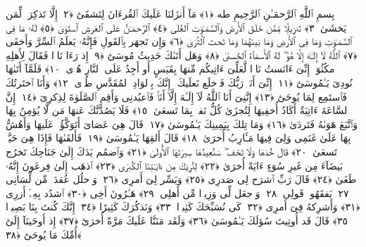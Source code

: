 
  
    
  
    
    

\nopagebreak
  بِسمِ ٱللَّهِ ٱلرَّحمَـٰنِ ٱلرَّحِيمِ
  طه ﴿١﴾
 مَآ أَنزَلنَا عَلَيكَ ٱلقُرءَانَ لِتَشقَىٰٓ ﴿٢﴾
 إِلَّا تَذكِرَةًۭ لِّمَن يَخشَىٰ ﴿٣﴾
 تَنزِيلًۭا مِّمَّن خَلَقَ ٱلأَرضَ وَٱلسَّمَـٰوَٟتِ ٱلعُلَى ﴿٤﴾
 ٱلرَّحمَـٰنُ عَلَى ٱلعَرشِ ٱستَوَىٰ ﴿٥﴾
 لَهُۥ مَا فِى ٱلسَّمَـٰوَٟتِ وَمَا فِى ٱلأَرضِ وَمَا بَينَهُمَا وَمَا تَحتَ ٱلثَّرَىٰ ﴿٦﴾
 وَإِن تَجهَر بِٱلقَولِ فَإِنَّهُۥ يَعلَمُ ٱلسِّرَّ وَأَخفَى ﴿٧﴾
 ٱللَّهُ لَآ إِلَـٰهَ إِلَّا هُوَ ۖ لَهُ ٱلأَسمَآءُ ٱلحُسنَىٰ ﴿٨﴾
 وَهَل أَتَىٰكَ حَدِيثُ مُوسَىٰٓ ﴿٩﴾
 إِذ رَءَا نَارًۭا فَقَالَ لِأَهلِهِ ٱمكُثُوٓا۟ إِنِّىٓ ءَانَستُ نَارًۭا لَّعَلِّىٓ ءَاتِيكُم مِّنهَا بِقَبَسٍ أَو أَجِدُ عَلَى ٱلنَّارِ هُدًۭى ﴿١٠﴾
 فَلَمَّآ أَتَىٰهَا نُودِىَ يَـٰمُوسَىٰٓ ﴿١١﴾
 إِنِّىٓ أَنَا۠ رَبُّكَ فَٱخلَع نَعلَيكَ ۖ إِنَّكَ بِٱلوَادِ ٱلمُقَدَّسِ طُوًۭى ﴿١٢﴾
 وَأَنَا ٱختَرتُكَ فَٱستَمِع لِمَا يُوحَىٰٓ ﴿١٣﴾
 إِنَّنِىٓ أَنَا ٱللَّهُ لَآ إِلَـٰهَ إِلَّآ أَنَا۠ فَٱعبُدنِى وَأَقِمِ ٱلصَّلَوٰةَ لِذِكرِىٓ ﴿١٤﴾
 إِنَّ ٱلسَّاعَةَ ءَاتِيَةٌ أَكَادُ أُخفِيهَا لِتُجزَىٰ كُلُّ نَفسٍۭ بِمَا تَسعَىٰ ﴿١٥﴾
 فَلَا يَصُدَّنَّكَ عَنهَا مَن لَّا يُؤمِنُ بِهَا وَٱتَّبَعَ هَوَىٰهُ فَتَردَىٰ ﴿١٦﴾
 وَمَا تِلكَ بِيَمِينِكَ يَـٰمُوسَىٰ ﴿١٧﴾
 قَالَ هِىَ عَصَاىَ أَتَوَكَّؤُا۟ عَلَيهَا وَأَهُشُّ بِهَا عَلَىٰ غَنَمِى وَلِىَ فِيهَا مَـَٔارِبُ أُخرَىٰ ﴿١٨﴾
 قَالَ أَلقِهَا يَـٰمُوسَىٰ ﴿١٩﴾
 فَأَلقَىٰهَا فَإِذَا هِىَ حَيَّةٌۭ تَسعَىٰ ﴿٢٠﴾
 قَالَ خُذهَا وَلَا تَخَف ۖ سَنُعِيدُهَا سِيرَتَهَا ٱلأُولَىٰ ﴿٢١﴾
 وَٱضمُم يَدَكَ إِلَىٰ جَنَاحِكَ تَخرُج بَيضَآءَ مِن غَيرِ سُوٓءٍ ءَايَةً أُخرَىٰ ﴿٢٢﴾
 لِنُرِيَكَ مِن ءَايَـٰتِنَا ٱلكُبرَى ﴿٢٣﴾
 ٱذهَب إِلَىٰ فِرعَونَ إِنَّهُۥ طَغَىٰ ﴿٢٤﴾
 قَالَ رَبِّ ٱشرَح لِى صَدرِى ﴿٢٥﴾
 وَيَسِّر لِىٓ أَمرِى ﴿٢٦﴾
 وَٱحلُل عُقدَةًۭ مِّن لِّسَانِى ﴿٢٧﴾
 يَفقَهُوا۟ قَولِى ﴿٢٨﴾
 وَٱجعَل لِّى وَزِيرًۭا مِّن أَهلِى ﴿٢٩﴾
 هَـٰرُونَ أَخِى ﴿٣٠﴾
 ٱشدُد بِهِۦٓ أَزرِى ﴿٣١﴾
 وَأَشرِكهُ فِىٓ أَمرِى ﴿٣٢﴾
 كَى نُسَبِّحَكَ كَثِيرًۭا ﴿٣٣﴾
 وَنَذكُرَكَ كَثِيرًا ﴿٣٤﴾
 إِنَّكَ كُنتَ بِنَا بَصِيرًۭا ﴿٣٥﴾
 قَالَ قَد أُوتِيتَ سُؤلَكَ يَـٰمُوسَىٰ ﴿٣٦﴾
 وَلَقَد مَنَنَّا عَلَيكَ مَرَّةً أُخرَىٰٓ ﴿٣٧﴾
 إِذ أَوحَينَآ إِلَىٰٓ أُمِّكَ مَا يُوحَىٰٓ ﴿٣٨﴾

